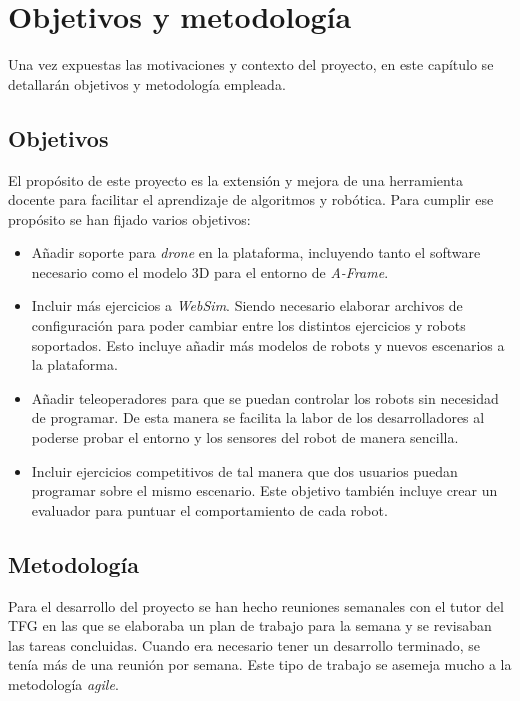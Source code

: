 \chapter{Objetivos y metodología}
Una vez expuestas las motivaciones y contexto del proyecto, en este capítulo se detallarán objetivos y metodología empleada. 

\label{chap:objetivos}
\section{Objetivos}
El propósito de este proyecto es la extensión y mejora de una herramienta docente para facilitar el aprendizaje de algoritmos y robótica. Para cumplir ese propósito se han fijado varios objetivos:
\begin{itemize}
    \item Añadir soporte para \textit{drone} en la plataforma, incluyendo tanto el software necesario como el modelo 3D para el entorno de \textit{A-Frame}.
    
    \item Incluir más ejercicios a \textit{WebSim}. Siendo necesario elaborar archivos de configuración para poder cambiar entre los distintos ejercicios y robots soportados. Esto incluye añadir más modelos de robots y nuevos escenarios a la plataforma.
    
    \item Añadir teleoperadores para que se puedan controlar los robots sin necesidad de programar. De esta manera se facilita la labor de los desarrolladores al poderse probar el entorno y los sensores del robot de manera sencilla.
    
    \item Incluir ejercicios competitivos de tal manera que dos usuarios puedan programar sobre el mismo escenario. Este objetivo también incluye crear un evaluador para puntuar el comportamiento de cada robot. 
    
\end{itemize}
\section{Metodología}
\label{sec:metodologia}

Para el desarrollo del proyecto se han hecho reuniones semanales con el tutor del TFG en las que se elaboraba un plan de trabajo para la semana y se revisaban las tareas concluidas. Cuando era necesario tener un desarrollo terminado, se tenía más de una reunión por semana. Este tipo de trabajo se asemeja mucho a la metodología \textit{agile}. \newline

